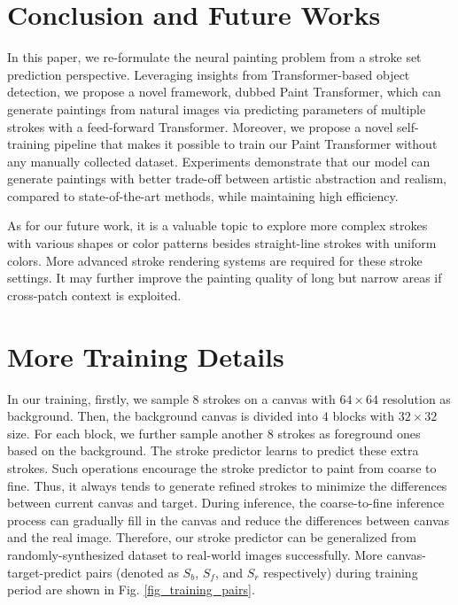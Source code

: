 \documentclass[10pt,twocolumn,letterpaper]{article}
\begin{document}
\section{Conclusion and Future Works}
In this paper, we re-formulate the neural painting problem from a stroke set prediction perspective.
Leveraging insights from Transformer-based object detection, we propose a novel framework, dubbed Paint Transformer, which can generate paintings from natural images via predicting parameters of multiple strokes with a feed-forward Transformer.
Moreover, we propose a novel self-training pipeline that makes it possible to train our Paint Transformer without any manually collected dataset. 
Experiments demonstrate that our model can generate paintings with better trade-off between artistic abstraction and realism, compared to state-of-the-art methods, while maintaining high efficiency. 

As for our future work, it is a valuable topic to explore more complex strokes with various shapes or color patterns besides straight-line strokes with uniform colors. 
More advanced stroke rendering systems are required for these stroke settings. 
It may further improve the painting quality of long but narrow areas if cross-patch context is exploited. 







{\small

\balance

}

\appendix



\twocolumn[{\begin{figure}[H]
\hsize=\textwidth \centering
\texttt{[image: Figure/training\_pairs.pdf]}
\caption{Canvas-target-predict pairs in training.}
\label{fig_training_pairs}
\end{figure}
}]

\section{More Training Details}
In our training, firstly, we sample $8$ strokes on a canvas with $64\times64$ resolution as background. 
Then, the background canvas is divided into $4$ blocks with $32\times32$ size. 
For each block, we further sample another $8$ strokes as foreground ones based on the background. 
The stroke predictor learns to predict these extra strokes.
Such operations encourage the stroke predictor to paint from coarse to fine. 
Thus, it always tends to generate refined strokes to minimize the differences between current canvas and target. 
During inference, the coarse-to-fine inference process can gradually fill in the canvas and reduce the differences between canvas and the real image.
Therefore, our stroke predictor can be generalized from randomly-synthesized dataset to real-world images successfully. 
More canvas-target-predict pairs (denoted as $S_b$, $S_f$, and $S_r$ respectively) during training period are shown in Fig. \ref{fig_training_pairs}.
\end{document}
